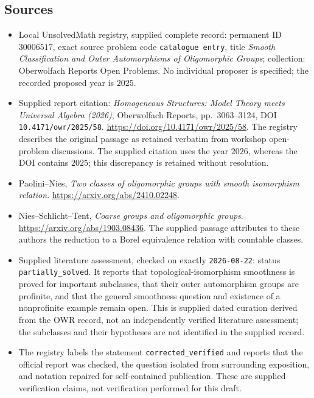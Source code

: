\documentclass[11pt]{article}
\begin{document}
\subsection{Sources}
\begin{itemize}
\item Local UnsolvedMath registry, supplied complete record: permanent ID \(30006517\), exact source problem code \texttt{catalogue entry}, title \emph{Smooth Classification and Outer Automorphisms of Oligomorphic Groups}; collection: Oberwolfach Reports Open Problems. No individual proposer is specified; the recorded proposed year is \(2025\).
\item Supplied report citation: \emph{Homogeneous Structures: Model Theory meets Universal Algebra (2026)}, Oberwolfach Reports, pp.~3063--3124, DOI \texttt{10.4171/owr/2025/58}. \url{https://doi.org/10.4171/owr/2025/58}. The registry describes the original passage as retained verbatim from workshop open-problem discussions. The supplied citation uses the year \(2026\), whereas the DOI contains \(2025\); this discrepancy is retained without resolution.
\item Paolini--Nies, \emph{Two classes of oligomorphic groups with smooth isomorphism relation}. \url{https://arxiv.org/abs/2410.02248}.
\item Nies--Schlicht--Tent, \emph{Coarse groups and oligomorphic groups}. \url{https://arxiv.org/abs/1903.08436}. The supplied passage attributes to these authors the reduction to a Borel equivalence relation with countable classes.
\item Supplied literature assessment, checked on exactly \texttt{2026-08-22}: status \texttt{partially\_solved}. It reports that topological-isomorphism smoothness is proved for important subclasses, that their outer automorphism groups are profinite, and that the general smoothness question and existence of a nonprofinite example remain open. This is supplied dated curation derived from the OWR record, not an independently verified literature assessment; the subclasses and their hypotheses are not identified in the supplied record.
\item The registry labels the statement \texttt{corrected\_verified} and reports that the official report was checked, the question isolated from surrounding exposition, and notation repaired for self-contained publication. These are supplied verification claims, not verification performed for this draft.
\end{itemize}
\end{document}
